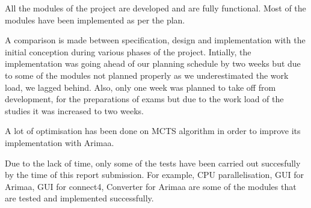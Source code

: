 All the modules of the project are developed and are fully functional. Most of the modules have been implemented as per the plan.

A comparison is made between specification, design and implementation with the initial conception during various phases of the project.
Intially, the implementation was going ahead of our planning schedule by two weeks but due to some of the modules not planned properly as we underestimated the work load, we lagged behind. Also, only one week was planned to take off from development, for the preparations of exams but due to the work load of the studies it was increased to two weeks.

A lot of optimisation has been done on MCTS algorithm in order to improve its implementation with Arimaa. 

Due to the lack of time, only some of the tests have been carried out succesfully by the time of this report submission. For example, CPU parallelisation, GUI for Arimaa, GUI for connect4, Converter for Arimaa are some of the modules that are tested and implemented successfully.